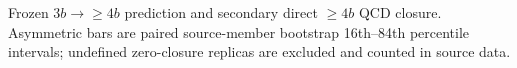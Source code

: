 Frozen $3b\rightarrow{\geq4b}$ prediction and secondary direct $\geq4b$ QCD closure. Asymmetric bars are paired source-member bootstrap 16th--84th percentile intervals; undefined zero-closure replicas are excluded and counted in source data.
